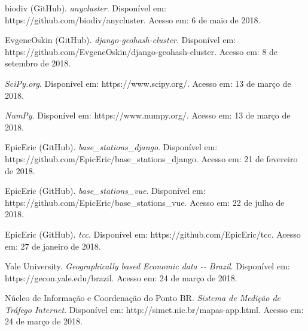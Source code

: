 \documentclass[]{politex}
\begin{document}
\begin{thebibliography}{9}
    biodiv (GitHub).
    \textit{anycluster}.
    Disponível em: https://github.com/biodiv/anycluster.
    Acesso em: 6 de maio de 2018.

    EvgeneOskin (GitHub).
    \textit{django-geohash-cluster}.
    Disponível em: https://github.com/EvgeneOskin/django-geohash-cluster.
    Acesso em: 8 de setembro de 2018.

    \textit{SciPy.org}.
    Disponível em: https://www.scipy.org/.
    Acesso em: 13 de março de 2018.

    \textit{NumPy}.
    Disponível em: https://www.numpy.org/.
    Acesso em: 13 de março de 2018.

    EpicEric (GitHub).
    \textit{base\_stations\_django}.
    Disponível em: https://github.com/EpicEric/base\_stations\_django.
    Acesso em: 21 de fevereiro de 2018.

    EpicEric (GitHub).
    \textit{base\_stations\_vue}.
    Disponível em: https://github.com/EpicEric/base\_stations\_vue.
    Acesso em: 22 de julho de 2018.

    EpicEric (GitHub).
    \textit{tcc}.
    Disponível em: https://github.com/EpicEric/tcc.
    Acesso em: 27 de janeiro de 2018.

    Yale University.
    \textit{Geographically based Economic data -{}- Brazil}.
    Disponível em: https://gecon.yale.edu/brazil.
    Acesso em: 24 de março de 2018.

    Núcleo de Informação e Coordenação do Ponto BR.
    \textit{Sistema de Medição de Tráfego Internet}.
    Disponível em: http://simet.nic.br/mapas-app.html.
    Acesso em: 24 de março de 2018.

\end{thebibliography}
\apendice


\anexo
\end{document}
